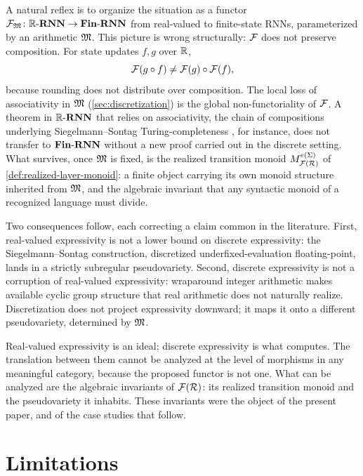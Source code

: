 \documentclass{article}
\begin{document}
A natural reflex is to organize the situation as a functor $\mathcal{F}_{\mathfrak{M}} \colon \mathbb{R}\text{-}\mathbf{RNN} \to \mathbf{Fin}\text{-}\mathbf{RNN}$ from real-valued to finite-state RNNs, parameterized by an arithmetic $\mathfrak{M}$. 
This picture is wrong structurally: $\mathcal{F}$ does not preserve composition. 
For state updates $f, g$ over $\mathbb{R}$,
\begin{equation*}
\mathcal{F}(g \circ f) \neq \mathcal{F}(g) \circ \mathcal{F}(f),
\end{equation*}
because rounding does not distribute over composition. 
The local loss of associativity in $\mathfrak{M}$ (\cref{sec:discretization}) is the global non-functoriality of $\mathcal{F}$. 
A theorem in $\mathbb{R}\text{-}\mathbf{RNN}$ that relies on associativity, the chain of compositions underlying Siegelmann--Sontag Turing-completeness \citep{Siegelmann1992OnTC}, for instance, does not transfer to $\mathbf{Fin}\text{-}\mathbf{RNN}$ without a new proof carried out in the discrete setting. 
What survives, once $\mathfrak{M}$ is fixed, is the realized transition monoid $M_{\mathcal{F}(\mathcal{R})}^{e(\Sigma)}$ of \cref{def:realized-layer-monoid}: a finite object carrying its own monoid structure inherited from $\mathfrak{M}$, and the algebraic invariant that any syntactic monoid of a recognized language must divide.

Two consequences follow, each correcting a claim common in the literature. 
First, real-valued expressivity is not a lower bound on discrete expressivity: the Siegelmann--Sontag construction, discretized underfixed-evaluation floating-point, lands in a strictly subregular pseudovariety. 
Second, discrete expressivity is not a corruption of real-valued expressivity: wraparound integer arithmetic makes available cyclic group structure that real arithmetic does not naturally realize. 
Discretization does not project expressivity downward; it maps it onto a different pseudovariety, determined by $\mathfrak{M}$.

Real-valued expressivity is an ideal; discrete expressivity is what computes. 
The translation between them cannot be analyzed at the level of morphisms in any meaningful category, because the proposed functor is not one. 
What can be analyzed are the algebraic invariants of $\mathcal{F}(\mathcal{R})$: its realized transition monoid and the pseudovariety it inhabits. 
These invariants were the object of the present paper, and of the case studies that follow. 

\section{Limitations} 
\end{document}
